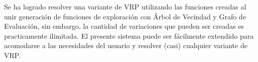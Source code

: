 Se ha logrado resolver una variante de VRP utilizando las funciones creadas al unir generación de funciones de exploración con Árbol de Vecindad y Grafo de Evaluación, sin embargo, la cantidad de variaciones que pueden ser creadas es practicamente ilimitada. El presente sistema puede ser fácilmente extendido para acomodarse a las necesidades del usuario y resolver (casi) cualquier variante de VRP.










